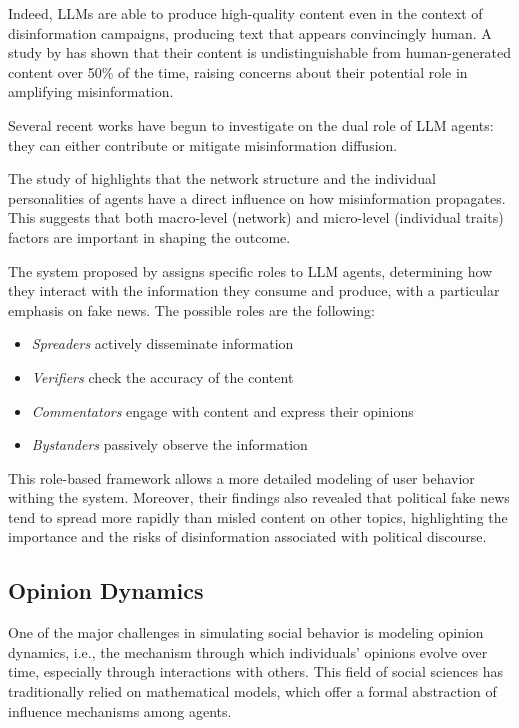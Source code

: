 Indeed, LLMs are able to produce high-quality content even in the context of disinformation campaigns, producing text that appears convincingly human. A study by \cite{williams2025hqdisinformation} has shown that their content is undistinguishable from human-generated content over 50\% of the time, raising concerns about their potential role in amplifying misinformation.

Several recent works have begun to investigate on the dual role of LLM agents: they can either contribute or mitigate misinformation diffusion.

\medskip
The study of \citet{hu2025simulatingrumorspreadingsocial} highlights that the network structure and the individual personalities of agents have a direct influence on how misinformation propagates. This suggests that both macro-level (network) and micro-level (individual traits) factors are important in shaping the outcome.

\medskip
The system proposed by \citet{liu2024tinyslipgiantleap} assigns specific roles to LLM agents, determining how they interact with the information they consume and produce, with a particular emphasis on fake news. 
The possible roles are the following: 

\begin{itemize}
    \item \textit{Spreaders} actively disseminate information
    \item \textit{Verifiers} check the accuracy of the content
    \item \textit{Commentators} engage with content and express their opinions
    \item \textit{Bystanders} passively observe the information
\end{itemize}

This role-based framework allows a more detailed modeling of user behavior withing the system.
Moreover, their findings also revealed that political fake news tend to spread more rapidly than misled content on other topics, highlighting the importance and the risks of disinformation associated with political discourse.



\subsection{Opinion Dynamics}
One of the major challenges in simulating social behavior is modeling opinion dynamics, i.e., the mechanism through which individuals' opinions evolve over time, especially through interactions with others. 
This field of social sciences has traditionally relied on mathematical models, which offer a formal abstraction of influence mechanisms among agents.

